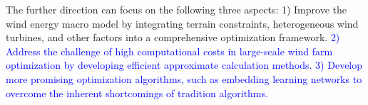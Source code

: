 \documentclass[journal,twoside]{IEEEtran}
\begin{document}
The further direction can focus on the following three aspects: 1) Improve the wind energy macro model by integrating terrain constraints, heterogeneous wind turbines, and other factors into a comprehensive optimization framework. \textcolor{blue}{2) Address the challenge of high computational costs in large-scale wind farm optimization by developing efficient approximate calculation methods. 3) Develop more promising optimization algorithms, such as embedding learning networks to overcome the inherent shortcomings of tradition algorithms.}    



\end{document}
